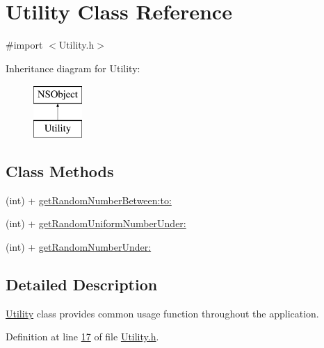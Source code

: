 \hypertarget{interface_utility}{\section{Utility Class Reference}
\label{d3/dc7/interface_utility}
}


{\ttfamily \#import $<$Utility.\-h$>$}

Inheritance diagram for Utility\-:\begin{figure}[H]
\begin{center}
\leavevmode
\includegraphics[height=2.000000cm]{d3/dc7/interface_utility}
\end{center}
\end{figure}
\subsection*{Class Methods}
\begin{DoxyCompactItemize}
\item 
(int) + \hyperlink{interface_utility_a1fadf871f2de27c45caf4497a769f3d8}{get\-Random\-Number\-Between\-:to\-:}
\item 
(int) + \hyperlink{interface_utility_a18dd8a4d335aacab117cfefa4fffb06c}{get\-Random\-Uniform\-Number\-Under\-:}
\item 
(int) + \hyperlink{interface_utility_a7af585df1742d836af6bc5b0eaf09cd3}{get\-Random\-Number\-Under\-:}
\end{DoxyCompactItemize}


\subsection{Detailed Description}
\hyperlink{interface_utility}{Utility} class provides common usage function throughout the application. 

Definition at line \hyperlink{_utility_8h_source_l00017}{17} of file \hyperlink{_utility_8h_source}{Utility.\-h}.



